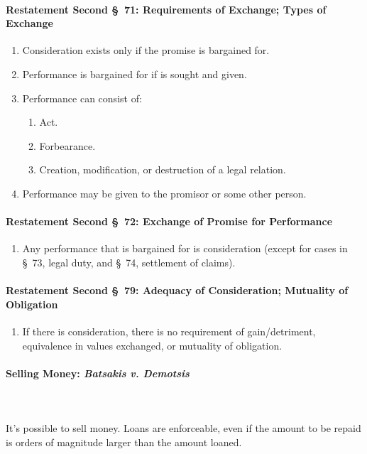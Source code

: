 \paragraph{Restatement Second \S\ 71: Requirements of Exchange; Types of 
Exchange}

\begin{enumerate}
    \item Consideration exists only if the promise is bargained for.
    \item Performance is bargained for if is sought and given.
    \item Performance can consist of:
    \begin{enumerate}
        \item Act.
        \item Forbearance.
        \item Creation, modification, or destruction of a legal relation.
    \end{enumerate}
    \item Performance may be given to the promisor or some other person.
\end{enumerate}

\paragraph{Restatement Second \S\ 72: Exchange of Promise for Performance}

\begin{enumerate}
    \item Any performance that is bargained for is consideration (except for 
    cases in \S\ 73, legal duty, and \S\ 74, settlement of claims).
\end{enumerate}

\paragraph{Restatement Second \S\ 79: Adequacy of Consideration; Mutuality of 
Obligation}

\begin{enumerate}
    \item If there is consideration, there is no requirement of 
    gain/detriment, equivalence in values exchanged, or mutuality of 
    obligation.
\end{enumerate}

\paragraph{Selling Money: \emph{Batsakis v. Demotsis}}
~\\\\
It's possible to sell money. Loans are enforceable, even if the amount to be 
repaid is orders of magnitude larger than the amount loaned.

